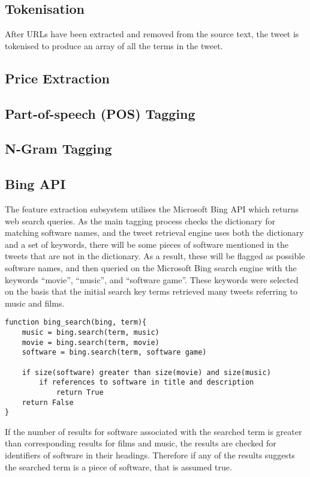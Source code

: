 \subsection{Tokenisation}
After URLs have been extracted and removed from the source text, the tweet is tokenised to produce an array of all the terms in the tweet.
\subsection{Price Extraction}
\subsection{Part-of-speech (POS) Tagging}
\subsection{N-Gram Tagging}

\subsection{Bing API}
The feature extraction subsystem utilises the Microsoft Bing API which returns web search queries. As the main tagging process checks the dictionary for matching software names, and the tweet retrieval engine uses both the dictionary and a set of keywords, there will be some pieces of software mentioned in the tweets that are not in the dictionary. As a result, these will be flagged as possible software names, and then queried on the Microsoft Bing search engine with the keywords ``movie'', ``music'', and ``software game''. These keywords were selected on the basis that the initial search key terms retrieved many tweets referring to music and films.
\begin{verbatim}
function bing_search(bing, term){
    music = bing.search(term, music)
    movie = bing.search(term, movie)
    software = bing.search(term, software game)

    if size(software) greater than size(movie) and size(music)
        if references to software in title and description
            return True
    return False
}
\end{verbatim}
If the number of results for software associated with the searched term is greater than corresponding results for films and music, the results are checked for identifiers of software in their headings. Therefore if any of the results suggests the searched term is a piece of software, that is assumed true.


